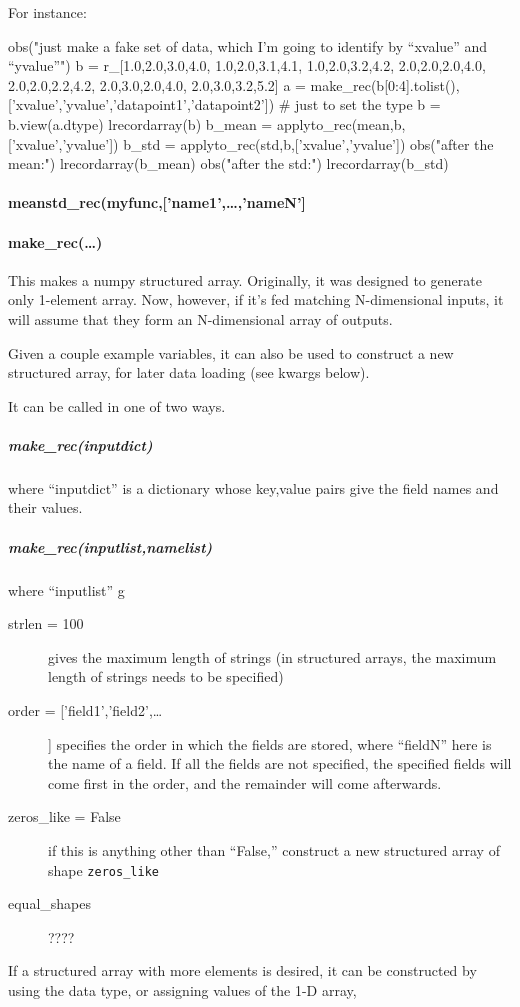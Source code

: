 For instance:

\begin{python}
obs("just make a fake set of data, which I'm going to identify by ``xvalue'' and ``yvalue''")
b = r_[1.0,2.0,3.0,4.0,
    1.0,2.0,3.1,4.1,
    1.0,2.0,3.2,4.2,
    2.0,2.0,2.0,4.0,
    2.0,2.0,2.2,4.2,
    2.0,3.0,2.0,4.0,
    2.0,3.0,3.2,5.2]
a = make_rec(b[0:4].tolist(),['xvalue','yvalue','datapoint1','datapoint2']) # just to set the type
b = b.view(a.dtype)
lrecordarray(b)
b_mean = applyto_rec(mean,b,['xvalue','yvalue'])
b_std = applyto_rec(std,b,['xvalue','yvalue'])
obs("after the mean:")
lrecordarray(b_mean)
obs("after the std:")
lrecordarray(b_std)
\end{python}

\paragraph{meanstd\_rec(myfunc,['name1',\ldots,'nameN']}
\paragraph{make\_rec(\ldots)}
This makes a numpy structured array.
Originally, it was designed to generate only 1-element array.
Now, however, if it's fed matching N-dimensional inputs,
    it will assume that they form an N-dimensional array of outputs.

Given a couple example variables, it can also be used to construct a new structured array, for later data loading (see kwargs below).

It can be called in one of two ways.

\subparagraph{make\_rec(inputdict)} where ``inputdict'' is a dictionary
    whose key,value pairs give the field names and their values.

\subparagraph{make\_rec(inputlist,namelist)}
    where ``inputlist'' g
\begin{mykwargs}
    \begin{description}
        \item[strlen = 100] gives the maximum length of strings
            (in structured arrays, the maximum length of strings needs to be
            specified)
        \item[order = ['field1','field2',\ldots] ]
            specifies the order in which the fields are stored,
            where ``fieldN'' here is the name of a field.
            If all the fields are not specified, the specified fields
            will come first in the order, and the remainder will come afterwards.
        \item[zeros_like = False] if this is anything other than ``False,'' construct a new structured array of shape \texttt{zeros\_like} 
        \item[equal\_shapes] ???? 
    \end{description}
\end{mykwargs}
If a structured array with more elements is desired,
    it can be constructed by using the data type, or assigning values of the 1-D array,
